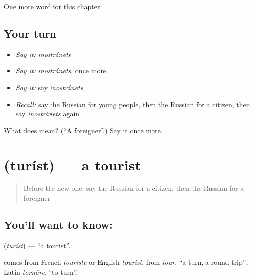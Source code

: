 \begin{grammarlens}[title={What you've built}]
One more word for this chapter.
\end{grammarlens}

\subsection*{Your turn}
\begin{itemize}
\raggedright
  \item \emph{Say it:} \emph{inostránets}
  \item \emph{Say it:} \emph{inostránets}, once more
  \item \emph{Say it:} say \emph{inostránets}
  \item \emph{Recall:} say the Russian for young people, then the Russian for a citizen, then say \emph{inostránets} again
\end{itemize}

\begin{tcolorbox}[breakable,colback=teal!4,colframe=teal!35!black,title={Before you move on}]
What does  mean? (\textquotedblleft{}A foreigner\textquotedblright{}.) Say it once more.
\end{tcolorbox}
\section[\texorpdfstring{\ru{турист} (turíst)}{турист (turíst)}]{ (turíst) — a tourist}

\label{lesson:RU-C199-turist}



\begin{quote}
Before the new one: say the Russian for a citizen, then the Russian for a foreigner.
\end{quote}

\subsection*{You'll want to know: }
\textbf{} (\emph{turíst}) — \textquotedblleft{}a tourist\textquotedblright{}.

\begin{cousinweb}
\textbf{} comes from French \emph{touriste} or English \emph{tourist}, from \emph{tour}, \textquotedblleft{}a turn, a round trip\textquotedblright{}, Latin \emph{tornāre}, \textquotedblleft{}to turn\textquotedblright{}.
\end{cousinweb}


